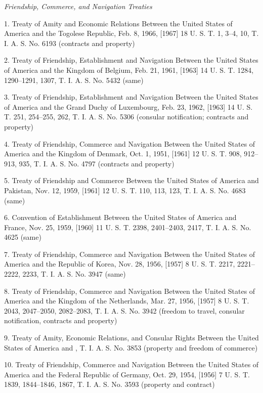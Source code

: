\emph{Friendship, Commerce, and Navigation Treaties}

    1. Treaty of Amity and Economic Relations Between the United
    States of America and the Togolese Re\newpage public, Feb. 8, 1966,
    [1967] 18 U. S. T. 1, 3--4, 10, T. I. A. S. No. 6193 (contracts and
    property)

    2. Treaty of Friendship, Establishment and Navigation Between the
    United States of America and the Kingdom of Belgium, Feb. 21, 1961,
    [1963] 14 U. S. T. 1284, 1290--1291, 1307, T. I. A. S. No. 5432
    (same)

    3. Treaty of Friendship, Establishment and Navigation Between the
    United States of America and the Grand Duchy of Luxembourg, Feb. 23,
    1962, [1963] 14 U. S. T. 251, 254--255, 262, T. I. A. S. No. 5306
    (consular notification; contracts and property)

    4. Treaty of Friendship, Commerce and Navigation Between the
    United States of America and the Kingdom of Denmark, Oct. 1, 1951,
    [1961] 12 U. S. T. 908, 912--913, 935, T. I. A. S. No. 4797
    (contracts and property)

    5. Treaty of Friendship and Commerce Between the United States of
    America and Pakistan, Nov. 12, 1959, [1961] 12 U. S. T. 110, 113,
    123, T. I. A. S. No. 4683 (same)

    6. Convention of Establishment Between the United States of
    America and France, Nov. 25, 1959, [1960] 11 U. S. T. 2398,
    2401--2403, 2417, T. I. A. S. No. 4625 (same)

    7. Treaty of Friendship, Commerce and Navigation Between the
    United States of America and the Republic of Korea, Nov. 28, 1956,
    [1957] 8 U. S. T. 2217, 2221--2222, 2233, T. I. A. S. No. 3947
    (same)

    8. Treaty of Friendship, Commerce and Navigation Between the
    United States of America and the Kingdom of the Netherlands, Mar.
    27, 1956, [1957] 8 U. S. T. 2043, 2047--2050, 2082--2083, T. I. A.
    S. No. 3942 (freedom to travel, consular notification, contracts and
    property)

    9. Treaty of Amity, Economic Relations, and Consular Rights
    Between the United States of America and , T. I. A. S.
    No. 3853 (property and freedom of commerce)

    10. Treaty of Friendship, Commerce and Navigation Between the
    United States of America and the Federal Republic of Germany, Oct.
    29, 1954, [1956] 7 U. S. T. 1839, 1844--1846, 1867, T. I. A. S. No.
    3593 (property and contract)

